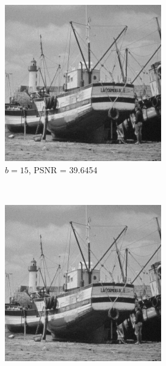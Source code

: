 \documentclass{article}
\begin{document}
\begin{enumerate}[label=(\alph*)]
\begin{figure}[!htb]
        \begin{subfigure}[b]{0.3\textwidth}
            \includegraphics[width=\textwidth]{img/RG15.png}
            \caption{$b = 15$, PSNR = 39.6454}
        \end{subfigure}
        ~
        \begin{subfigure}[b]{0.3\textwidth}
            \includegraphics[width=\textwidth]{img/RG20.png}

\end{subfigure}
\end{figure}
\end{enumerate}
\end{document}
